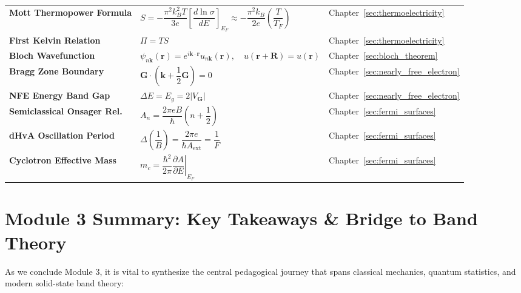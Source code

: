 \documentclass[11pt,a4paper]{article}
\newcommand{\vb}[1]{\mathbf{#1}}
\begin{document}
\begin{longtable}{p{} p{} p{}}
\textbf{Mott Thermopower Formula} & $S = -\dfrac{\pi^2 k_B^2 T}{3e}\left[\dfrac{d\ln\sigma}{dE}\right]_{E_F} \approx -\dfrac{\pi^2 k_B}{2e}\left(\dfrac{T}{T_F}\right)$ & Chapter~\ref{sec:thermoelectricity} \\
\textbf{First Kelvin Relation} & $\Pi = T S$ & Chapter~\ref{sec:thermoelectricity} \\
\textbf{Bloch Wavefunction} & $\psi_{n\vb{k}}(\vb{r}) = e^{i\vb{k}\cdot\vb{r}}u_{n\vb{k}}(\vb{r}), \quad u(\vb{r}+\vb{R}) = u(\vb{r})$ & Chapter~\ref{sec:bloch_theorem} \\
\textbf{Bragg Zone Boundary} & $\vb{G}\cdot\left(\vb{k} + \dfrac{1}{2}\vb{G}\right) = 0$ & Chapter~\ref{sec:nearly_free_electron} \\
\textbf{NFE Energy Band Gap} & $\Delta E = E_g = 2|V_{\vb{G}}|$ & Chapter~\ref{sec:nearly_free_electron} \\
\textbf{Semiclassical Onsager Rel.} & $A_n = \dfrac{2\pi e B}{\hbar}\left(n + \dfrac{1}{2}\right)$ & Chapter~\ref{sec:fermi_surfaces} \\
\textbf{dHvA Oscillation Period} & $\Delta\left(\dfrac{1}{B}\right) = \dfrac{2\pi e}{\hbar A_{\mathrm{ext}}} = \dfrac{1}{F}$ & Chapter~\ref{sec:fermi_surfaces} \\
\textbf{Cyclotron Effective Mass} & $m_c = \dfrac{\hbar^2}{2\pi}\left.\dfrac{\partial A}{\partial E}\right|_{E_F}$ & Chapter~\ref{sec:fermi_surfaces} \\
\bottomrule
\end{longtable}

\clearpage

\section*{Module 3 Summary: Key Takeaways \& Bridge to Band Theory}

As we conclude Module 3, it is vital to synthesize the central pedagogical journey that spans classical mechanics, quantum statistics, and modern solid-state band theory:
\end{document}
